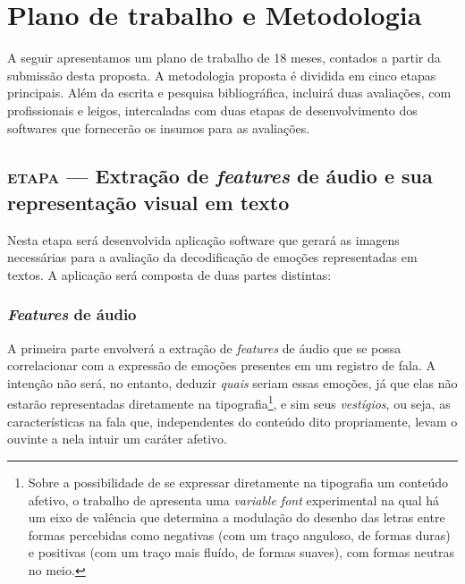 \documentclass[a4paper,11pt,titlepage,singlespacing]{article}
\newcommand{\etapa}[1]{\textsc{etapa \oldstylenums{#1}}}
\begin{document}
    

\section{Plano de trabalho e Metodologia}
\label{sec:metodologia}

A seguir apresentamos um plano de trabalho de 18 meses, contados a partir da submissão desta proposta. %
A metodologia proposta é dividida em cinco etapas principais.
Além da escrita e pesquisa bibliográfica, incluirá duas avaliações, com profissionais e leigos, intercaladas com duas etapas de desenvolvimento dos softwares que fornecerão os insumos para as avaliações.

\subsection{\etapa{1} — Extração de \textit{features} de áudio e sua representação visual em texto}
\label{subsec:etapa1}
Nesta etapa será desenvolvida aplicação software que gerará as imagens necessárias para a avaliação da decodificação de emoções representadas em textos. A aplicação será composta de duas partes distintas:

\subsubsection*{\textit{Features} de áudio}

A primeira parte envolverá a extração de \textit{features} de áudio que se possa correlacionar com a expressão de emoções presentes em um registro de fala. A intenção não será, no entanto, deduzir \textit{quais} seriam essas emoções, já que elas não estarão representadas diretamente na tipografia\footnote{Sobre a possibilidade de se expressar diretamente na tipografia um conteúdo afetivo, o trabalho de  apresenta uma \textit{variable font} experimental na qual há um eixo de valência que determina a modulação do desenho das letras entre formas percebidas como negativas (com um traço anguloso, de formas duras) e positivas (com um traço mais fluído, de formas suaves), com formas neutras no meio.}, e sim seus \textit{vestígios}, ou seja, as características na fala que, independentes do conteúdo dito propriamente, levam o ouvinte a nela intuir um caráter afetivo.
\end{document}
